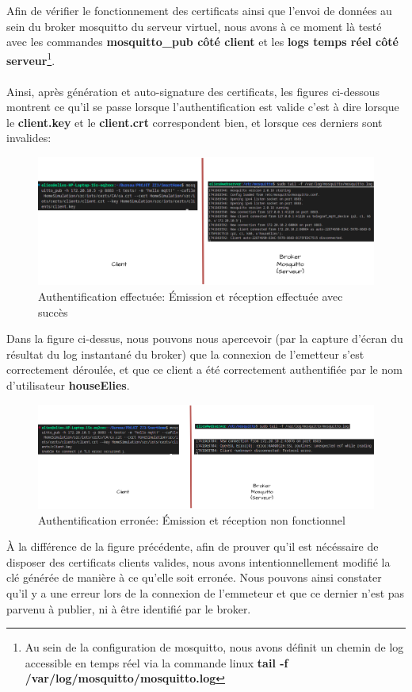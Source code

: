 \documentclass[10pt, a4paper]{report}
\begin{document}
	Afin de vérifier le fonctionnement des certificats ainsi que l'envoi de données au sein du broker mosquitto du serveur virtuel, nous avons à ce moment là testé avec les commandes \textbf{mosquitto\_pub côté client} et les \textbf{logs temps réel côté serveur}\footnote{Au sein de la configuration de mosquitto, nous avons définit un chemin de log accessible en temps réel via la commande linux \textbf{tail -f /var/log/mosquitto/mosquitto.log}}.\\\\ Ainsi, après génération et auto-signature des certificats, les figures ci-dessous montrent ce qu'il se passe lorsque l'authentification est valide c'est à dire lorsque le \textbf{client.key} et le \textbf{client.crt} correspondent bien, et lorsque ces derniers sont invalides:
	
	\begin{figure}[h!]
		\centering
		\includegraphics[width=1\textwidth]{ressources/img/preuves/emissionReceptionMosquittoValide.drawio}
		\caption{Authentification effectuée: Émission et réception effectuée avec succès}
		\label{fig:mosquittoValide}
	\end{figure}
	
	Dans la figure ci-dessus, nous pouvons nous apercevoir (par la capture d'écran du résultat du log instantané du broker) que la connexion de l'emetteur s'est correctement déroulée, et que ce client a été correctement authentifiée par le nom d'utilisateur \textbf{houseElies}. \newpage
	
	\begin{figure}[h!]
		\centering
		\includegraphics[width=1\textwidth]{ressources/img/preuves/emissionReceptionMosquittoInvalide.drawio}
		\caption{Authentification erronée: Émission et réception non fonctionnel}
		\label{fig:mosquittoInvalide}
	\end{figure}
	À la différence de la figure précédente, afin de prouver qu'il est nécéssaire de disposer des certificats clients valides, nous avons intentionnellement modifié la clé générée de manière à ce qu'elle soit erronée. Nous pouvons ainsi constater qu'il y a une erreur lors de la connexion de l'emmeteur et que ce dernier n'est pas parvenu à publier, ni à être identifié par le broker.
	
\end{document}
